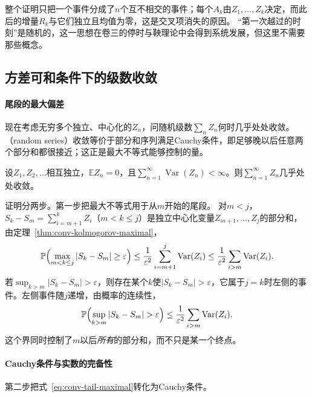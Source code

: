 整个证明只把一个事件分成了$n$个互不相交的事件；每个$A_k$由$Z_1,\ldots,Z_k$决定，而此后的增量$R_k$与它们独立且均值为零，这是交叉项消失的原因。
“第一次越过的时刻”是随机的，这一思想在卷三的停时与鞅理论中会得到系统发展，但这里不需要那些概念。

\subsection{方差可和条件下的级数收敛}

\paragraph{尾段的最大偏差}
现在考虑无穷多个独立、中心化的$Z_n$，问随机级数$\sum_nZ_n$何时几乎处处收敛。
（random series）收敛等价于部分和序列满足Cauchy条件，即足够晚以后任意两个部分和都很接近；这正是最大不等式能够控制的量。

\begin{theorem}[方差可和的独立级数]
\label{thm:conv-series}
设$Z_1,Z_2,\ldots$相互独立，$\mathbb EZ_n=0$，且$\sum_{n=1}^{\infty}\operatorname{Var}(Z_n)<\infty$。则$\sum_{n=1}^{\infty}Z_n$几乎处处收敛。
\end{theorem}

证明分两步。第一步把最大不等式用于从$m$开始的尾段。
对$m<j$，$S_k-S_m=\sum_{i=m+1}^kZ_i$（$m<k\leq j$）是独立中心化变量$Z_{m+1},\ldots,Z_j$的部分和，由定理~\ref{thm:conv-kolmogorov-maximal}，
\[
  \mathbb P\Bigl(\max_{m<k\leq j}|S_k-S_m|\geq\varepsilon\Bigr)\leq\frac1{\varepsilon^2}\sum_{i=m+1}^j\operatorname{Var}(Z_i)\leq\frac1{\varepsilon^2}\sum_{i>m}\operatorname{Var}(Z_i).
\]
若$\sup_{k>m}|S_k-S_m|>\varepsilon$，则存在某个$k$使$|S_k-S_m|>\varepsilon$，它属于$j=k$时左侧的事件。左侧事件随$j$递增，由概率的连续性，
\begin{equation}
  \mathbb P\Bigl(\sup_{k>m}|S_k-S_m|>\varepsilon\Bigr)\leq\frac1{\varepsilon^2}\sum_{i>m}\operatorname{Var}(Z_i).
  \label{eq:conv-tail-maximal}
\end{equation}
这个界同时控制了$m$以后\emph{所有}的部分和，而不只是某一个终点。

\paragraph{Cauchy条件与实数的完备性}
第二步把式~\eqref{eq:conv-tail-maximal}转化为Cauchy条件。


